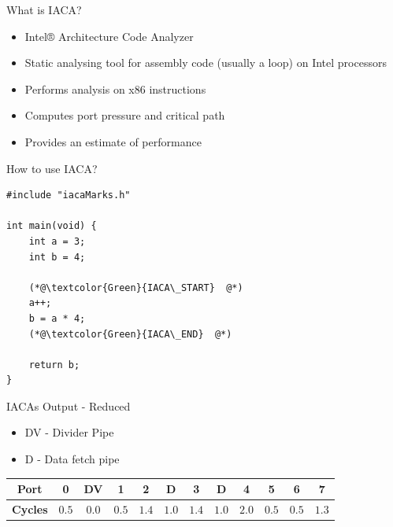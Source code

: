 \documentclass[10pt, tikz,border=2mm, xcolor=dvipsnames]{beamer}
\begin{document}
\begin{frame}{What is IACA?}

\begin{itemize}[<+- | alert@+>]
    \item Intel® Architecture Code Analyzer
    \item Static analysing tool for assembly code (usually a loop) on Intel processors
    \item Performs analysis on x86 instructions
    \item Computes port pressure and critical path
    \item Provides an estimate of performance
\end{itemize}

\end{frame}


\begin{frame}[fragile]{How to use IACA?}

\begin{lstlisting}
#include "iacaMarks.h"

int main(void) {
    int a = 3;
    int b = 4;
    
    (*@\textcolor{Green}{IACA\_START}  @*)
    a++;
    b = a * 4;
    (*@\textcolor{Green}{IACA\_END}  @*)
    
    return b;
}
\end{lstlisting}
\end{frame}

\begin{frame}[fragile]{IACAs Output - Reduced}
\begin{itemize}
    \item DV - Divider Pipe
    \item D\phantom{V} - Data fetch pipe
\end{itemize}
\begin{center}
\begin{tabular}{|c|c c|c|c c|c c|c|c|c|c|}
  \hline
  \textbf{Port} & 0 & DV & 1 & 2 & D & 3 & D & 4 & 5 & 6 & 7 \\ \hline
  \textbf{Cycles} & $0.5$ & $0.0$ & $0.5$ & $1.4$ & $1.0$ & $1.4$ & $1.0$ & $2.0$ & $0.5$ & $0.5$ & $1.3$ \\
  \hline
\end{tabular}
\end{center}
\end{frame}
\end{document}
